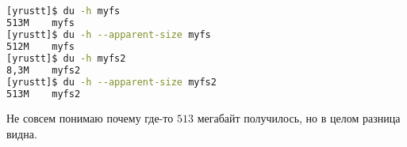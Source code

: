 \documentclass[12pt]{article}
\begin{document}
\subsection{}
\begin{lstlisting}[language=bash, frame=single]
[yrustt]$ du -h myfs
513M	myfs
[yrustt]$ du -h --apparent-size myfs
512M	myfs
[yrustt]$ du -h myfs2
8,3M	myfs2
[yrustt]$ du -h --apparent-size myfs2
513M	myfs2
\end{lstlisting}
Не совсем понимаю почему где-то $513$ мегабайт получилось, но в целом разница видна.
\end{document}
